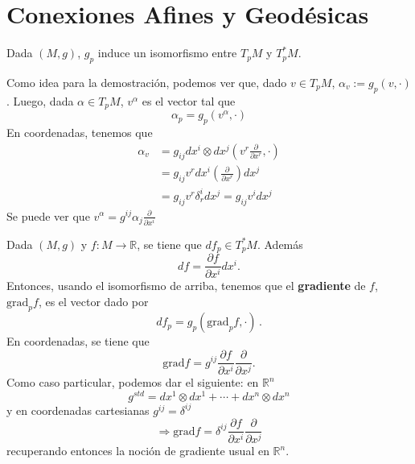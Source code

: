 \section{Conexiones Afines y Geod\'esicas}

\begin{theorem}
Dada $(M,g)$, $g_p$ induce un isomorfismo entre $T_pM$ y $T_p^*M$.    
\end{theorem}

Como idea para la demostraci\'on, podemos ver que, dado $v\in T_pM$, $\alpha_v:=g_p(v,\cdot)$. 
Luego, dada $\alpha\in T_pM$, $v^\alpha$ es el vector tal que 
\begin{equation*}
    \alpha_p=g_p(v^\alpha,\cdot)
\end{equation*}
En coordenadas, tenemos que 
\begin{align*}
    \alpha_v&=g_{ij}dx^i\otimes dx^j\left(v^r\frac{\partial}{\partial x^r},\cdot\right)\\
    &=g_{ij}v^rdx^i\left(\frac{\partial}{\partial x^r}\right)dx^j\\
    &=g_{ij}v^r\delta_r^idx^j=g_{ij}v^idx^j
\end{align*}
Se puede ver que $v^\alpha=g^{ij}\alpha_j\frac{\partial}{\partial x^i}$

\begin{example}
Dada $(M,g)$ y $f\colon M\to\mathbb{R}$, se tiene que $df_p\in T_p^*M$. Adem\'as 
\begin{equation*}
    df=\frac{\partial f}{\partial x^i}dx^i.
\end{equation*}
Entonces, usando el isomorfismo de arriba, tenemos que el \textbf{gradiente} de $f$, $\text{grad}_pf$, es el vector dado por
\begin{equation*}
    df_p=g_p(\text{grad}_pf,\cdot)\,.
\end{equation*}
En coordenadas, se tiene que 
\begin{equation*}
    \text{grad}f=g^{ij}\frac{\partial f}{\partial x^i}\frac{\partial}{\partial x^j}.
\end{equation*}
Como caso particular, podemos dar el siguiente: en $\mathbb{R}^n$
\begin{equation*}
    g^{std}=dx^1\otimes dx^1+\cdots+dx^n\otimes dx^n
\end{equation*}
y en coordenadas cartesianas $g^{ij}=\delta^{ij}$
\begin{equation*}
    \Longrightarrow\text{grad}f=\delta^{ij}\frac{\partial f}{\partial x^i}\frac{\partial}{\partial x^j}
\end{equation*}
recuperando entonces la noci\'on de gradiente usual en $\mathbb R^n$.
\end{example}

